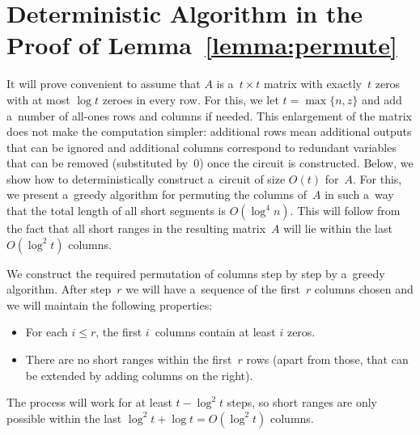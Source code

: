 \section{Deterministic Algorithm in the Proof of Lemma~\ref{lemma:permute}} \label{sec:deterministic}

It will prove convenient to assume that $A$ is a~$t \times t$ matrix with exactly~$t$ zeros with at most $\log t$ zeroes in every row. For this, we let $t=\max\{n, z\}$ and add a~number of
all-ones rows and columns if needed. This enlargement of the matrix
does not make the computation simpler: additional rows mean additional outputs that can be ignored and additional columns correspond to redundant variables that can be removed (substituted by~0) once the circuit is constructed. Below, we show how to deterministically construct a~circuit of size $O(t)$ for~$A$.
For this, we present a~greedy algorithm for permuting the columns
of~$A$ in such a~way that the total length of all short segments
is $O(\log^4n)$. This will follow from the fact that all short
ranges in the resulting matrix~$A$ will lie within the last $O(\log^2 t)$ columns.

We construct the required permutation of columns step by step by a~greedy algorithm. After step~$r$ we will have a~sequence of the first~$r$ columns chosen and we will maintain the following properties:
\begin{itemize}
\item For each $i \leq r$, the first $i$~columns contain at least $i$ zeros.
\item There are no short ranges within the first~$r$ rows (apart from those, that can be extended by adding columns on the right).
\end{itemize}
The process will work for at least $t - \log^2 t$ steps, so short ranges are only possible within the last $\log^2 t + \log t = O(\log^2 t)$ columns.

